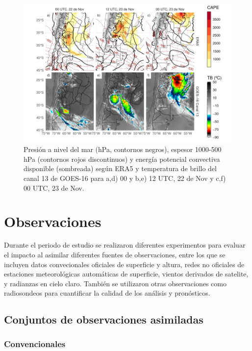 \documentclass[12pt,oneside,a4paper]{reedthesis}
\begin{document}
\begin{figure}

{\centering \includegraphics{thesis_files/figure-latex/caso-1} 

}

\caption{Presión a nivel del mar (hPa, contornos negros), espesor 1000-500 hPa (contornos rojos discontinuos) y energía potencial convectiva disponible (sombreada) según ERA5 y temperatura de brillo del canal 13 de GOES-16 para a,d) 00 y b,e) 12 UTC, 22 de Nov y c,f) 00 UTC, 23 de Nov.~}\label{fig:caso}
\end{figure}
\hypertarget{observaciones}{%
\section{Observaciones}\label{observaciones}}

Durante el periodo de estudio se realizaron diferentes experimentos para evaluar el impacto al asimilar diferentes fuentes de observaciones, entre los que se incluyen datos convecionales oficiales de superficie y altura, redes no oficiales de estaciones meteorológicas automáticas de superficie, vientos derivados de satelite, y radianzas en cielo claro. También se utilizaron otras observaciones como radiosondeos para cuantificar la calidad de los análisis y pronósticos.

\hypertarget{conjuntos-de-observaciones-asimiladas}{%
\subsection{Conjuntos de observaciones asimiladas}\label{conjuntos-de-observaciones-asimiladas}}

\hypertarget{convencionales}{%
\subsubsection{Convencionales}\label{convencionales}}
\end{document}
